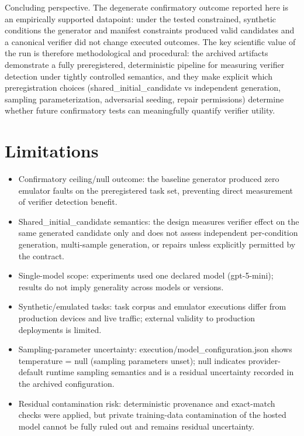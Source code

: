 \documentclass[conference]{IEEEtran}
\begin{document}
Concluding perspective. The degenerate confirmatory outcome reported here is an empirically supported datapoint: under the tested constrained, synthetic conditions the generator and manifest constraints produced valid candidates and a canonical verifier did not change executed outcomes. The key scientific value of the run is therefore methodological and procedural: the archived artifacts demonstrate a fully preregistered, deterministic pipeline for measuring verifier detection under tightly controlled semantics, and they make explicit which preregistration choices (shared\_initial\_candidate vs independent generation, sampling parameterization, adversarial seeding, repair permissions) determine whether future confirmatory tests can meaningfully quantify verifier utility.

\section{Limitations}
\begin{itemize}
\item Confirmatory ceiling/null outcome: the baseline generator produced zero emulator faults on the preregistered task set, preventing direct measurement of verifier detection benefit.
\item Shared\_initial\_candidate semantics: the design measures verifier effect on the same generated candidate only and does not assess independent per-condition generation, multi-sample generation, or repairs unless explicitly permitted by the contract.
\item Single-model scope: experiments used one declared model (gpt-5-mini); results do not imply generality across models or versions.
\item Synthetic/emulated tasks: task corpus and emulator executions differ from production devices and live traffic; external validity to production deployments is limited.
\item Sampling-parameter uncertainty: execution/model\_configuration.json shows temperature = null (sampling parameters unset); null indicates provider-default runtime sampling semantics and is a residual uncertainty recorded in the archived configuration.
\item Residual contamination risk: deterministic provenance and exact-match checks were applied, but private training-data contamination of the hosted model cannot be fully ruled out and remains residual uncertainty.
\end{itemize}
\end{document}
